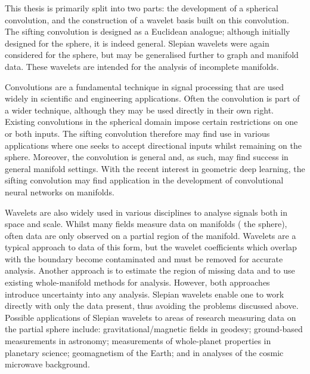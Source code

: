 \begin{impactstatement} %
    This thesis is primarily split into two parts: the development of a spherical convolution, and the construction of a wavelet basis built on this convolution.
    The sifting convolution is designed as a Euclidean analogue; although initially designed for the sphere, it is indeed general.
    Slepian wavelets were again considered for the sphere, but may be generalised further to graph and manifold data.
    These wavelets are intended for the analysis of incomplete manifolds.

    Convolutions are a fundamental technique in signal processing that are used widely in scientific and engineering applications.
    Often the convolution is part of a wider technique, although they may be used directly in their own right.
    Existing convolutions in the spherical domain impose certain restrictions on one or both inputs.
    The sifting convolution therefore may find use in various applications where one seeks to accept directional inputs whilst remaining on the sphere.
    Moreover, the convolution is general and, as such, may find success in general manifold settings.
    With the recent interest in geometric deep learning, the sifting convolution may find application in the development of convolutional neural networks on manifolds.

    Wavelets are also widely used in various disciplines to analyse signals both in space and scale.
    Whilst many fields measure data on manifolds (\ie{} the sphere), often data are only observed on a partial region of the manifold.
    Wavelets are a typical approach to data of this form, but the wavelet coefficients which overlap with the boundary become contaminated and must be removed for accurate analysis.
    Another approach is to estimate the region of missing data and to use existing whole-manifold methods for analysis.
    However, both approaches introduce uncertainty into any analysis.
    Slepian wavelets enable one to work directly with only the data present, thus avoiding the problems discussed above.
    Possible applications of Slepian wavelets to areas of research measuring data on the partial sphere include: gravitational/magnetic fields in geodesy; ground-based measurements in astronomy; measurements of whole-planet properties in planetary science; geomagnetism of the Earth; and in analyses of the cosmic microwave background.
\end{impactstatement}


